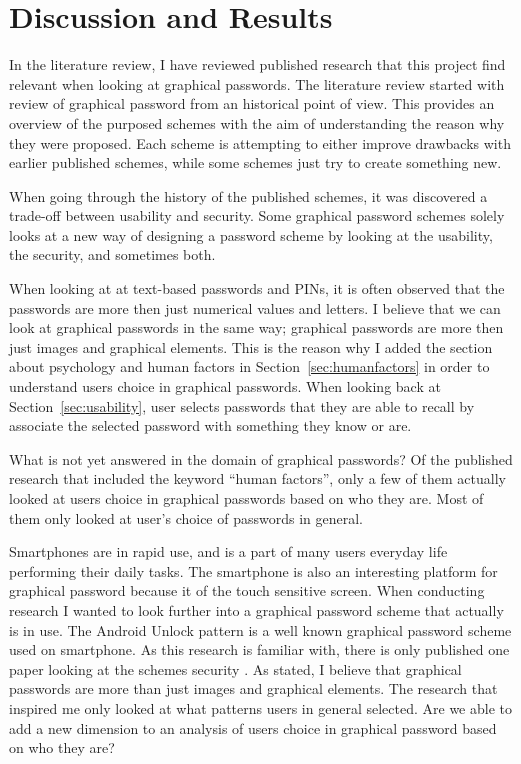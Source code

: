 \section{Discussion and Results}\label{sec:resultsLiteratureStudy}
    
  In the literature review, I have reviewed published research that this project find relevant when looking at graphical passwords. The literature review started with review of graphical password from an historical point of view. This provides an overview of the purposed schemes with the aim of understanding the reason why they were proposed. Each scheme is attempting to either improve drawbacks with earlier published schemes, while some schemes just try to create something new. 

  When going through the history of the published schemes, it was discovered a trade-off between usability and security. Some graphical password schemes solely looks at a new way of designing a password scheme by looking at the usability, the security, and sometimes both. 

  When looking at at text-based passwords and PINs, it is often observed that the passwords are more then just numerical values and letters. I believe that we can look at graphical passwords in the same way; graphical passwords are more then just images and graphical elements. This is the reason why I added the section about psychology and human factors in Section~\ref{sec:humanfactors} in order to understand users choice in graphical passwords. When looking back at Section~\ref{sec:usability}, user selects passwords that they are able to recall by associate the selected password with something they know or are. 

  What is not yet answered in the domain of graphical passwords? Of the published research that included the keyword ``human factors'', only a few of them actually looked at users choice in graphical passwords based on who they are. Most of them only looked at user's choice of passwords in general.

  Smartphones are in rapid use, and is a part of many users everyday life performing their daily tasks. The smartphone is also an interesting platform for graphical password because it of the touch sensitive screen. When conducting research I wanted to look further into a graphical password scheme that actually is in use. The Android Unlock pattern is a well known graphical password scheme used on smartphone. As this research is familiar with, there is only published one paper looking at the schemes security \cite{Uellenbeck}. As stated, I believe that graphical passwords are more than just images and graphical elements. The research that inspired me only looked at what patterns users in general selected. Are we able to add a new dimension to an analysis of users choice in graphical password based on who they are? 

